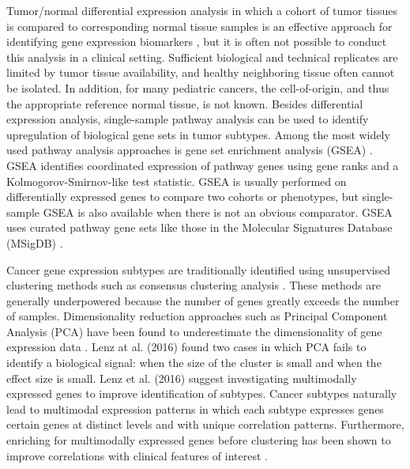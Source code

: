 \documentclass[10pt,letterpaper]{article}
\begin{document}
Tumor/normal differential expression analysis in which a cohort of tumor tissues is compared to corresponding normal tissue samples is an effective approach for identifying gene expression biomarkers \cite{andersCountbasedDifferentialExpression2013, andersDifferentialExpressionAnalysis2010, sonesonComparisonMethodsDifferential2013}, but it is often not possible to conduct this analysis in a clinical setting. Sufficient biological and technical replicates are limited by tumor tissue availability, and healthy neighboring tissue often cannot be isolated. In addition, for many pediatric cancers, the cell-of-origin, and thus the appropriate reference normal tissue, is not known. Besides differential expression analysis, single-sample pathway analysis can be used to identify upregulation of biological gene sets in tumor subtypes. Among the most widely used pathway analysis approaches is gene set enrichment analysis (GSEA) \cite{subramanianGeneSetEnrichment2005, moothaPGC1alpharesponsiveGenesInvolved2003}. GSEA identifies coordinated expression of pathway genes using gene ranks and a Kolmogorov-Smirnov-like test statistic. GSEA is usually performed on differentially expressed genes to compare two cohorts or phenotypes, but single-sample GSEA is also available when there is not an obvious comparator. GSEA uses curated pathway gene sets like those in the Molecular Signatures Database (MSigDB) \cite{liberzonMolecularSignaturesDatabase2011}.

Cancer gene expression subtypes are traditionally identified using unsupervised clustering methods such as consensus clustering analysis \cite{oyeladeClusteringAlgorithmsTheir2016,johnM3CMonteCarlo2018,wilkersonConsensusClusterPlusClassDiscovery2010a}. These methods are generally underpowered because the number of genes greatly exceeds the number of samples. Dimensionality reduction approaches such as Principal Component Analysis (PCA) have been found to underestimate the dimensionality of gene expression data \cite{lenzPrincipalComponentsAnalysis2016}. Lenz at al. (2016) found two cases in which PCA fails to identify a biological signal: when the size of the cluster is small and when the effect size is small. Lenz et al. (2016) suggest investigating multimodally expressed genes to improve identification of subtypes. Cancer subtypes naturally lead to multimodal expression patterns in which each subtype expresses genes certain genes at distinct levels and with unique correlation patterns. Furthermore, enriching for multimodally expressed genes before clustering has been shown to improve correlations with clinical features of interest \cite{yiliMultimodalityCriterionFeature2005}.
\end{document}

